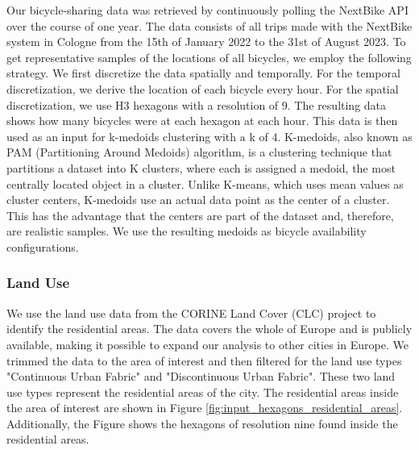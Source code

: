 Our bicycle-sharing data was retrieved by continuously polling the NextBike API over the course of one year.
The data consists of all trips made with the NextBike system in Cologne from the 15th of January 2022 to the 31st of August 2023.
To get representative samples of the locations of all bicycles, we employ the following strategy.
We first discretize the data spatially and temporally.
For the temporal discretization, we derive the location of each bicycle every hour.
For the spatial discretization, we use H3 hexagons with a resolution of 9.
The resulting data shows how many bicycles were at each hexagon at each hour.
This data is then used as an input for k-medoids clustering  with a k of 4.
K-medoids, also known as PAM (Partitioning Around Medoids) algorithm, is a clustering technique that partitions a dataset into K clusters, where each is assigned a medoid, the most centrally located object in a cluster. 
Unlike K-means, which uses mean values as cluster centers, K-medoids use an actual data point as the center of a cluster.
This has the advantage that the centers are part of the dataset and, therefore, are realistic samples.
We use the resulting medoids as bicycle availability configurations.

\subsubsection{Land Use}
\label{subs:land_use}

We use the land use data from the CORINE Land Cover (CLC) project  to identify the residential areas.
The data covers the whole of Europe and is publicly available, making it possible to expand our analysis to other cities in Europe.
We trimmed the data to the area of interest and then filtered for the land use types "Continuous Urban Fabric" and "Discontinuous Urban Fabric".
These two land use types represent the residential areas of the city.
The residential areas inside the area of interest are shown in Figure \ref{fig:input_hexagons_residential_areas}.
Additionally, the Figure shows the hexagons of resolution nine found inside the residential areas.

